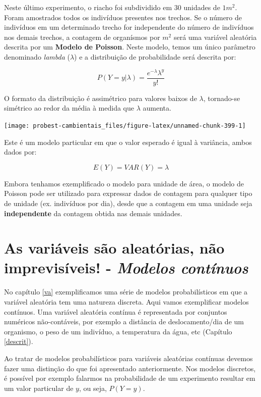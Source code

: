 \documentclass[
]{book}
\begin{document}
Neste último experimento, o riacho foi subdividido em 30 unidades de \(1m^2\). Foram amostrados todos os indivíduos presentes nos trechos. Se o número de indivíduos em um determinado trecho for independente do número de indivíduos nos demais trechos, a contagem de organísmos por \(m^2\) será uma variável aleatória descrita por um \textbf{Modelo de Poisson}. Neste modelo, temos um único parâmetro denominado \emph{lambda} (\(\lambda\)) e a distribuição de probabilidade será descrita por:

\[P(Y = y|\lambda) =  \frac{e^{-\lambda} \lambda^y}{y!}\]

O formato da distribuição é assimétrico para valores baixos de \(\lambda\), tornado-se simétrico ao redor da média à medida que \(\lambda\) aumenta.

\begin{center}\texttt{[image: probest-cambientais\_files/figure-latex/unnamed-chunk-399-1]} \end{center}

Este é um modelo particular em que o valor esperado é igual à variância, ambos dados por:

\[E(Y) = VAR(Y) = \lambda\]

Embora tenhamos exemplificado o modelo para unidade de área, o modelo de Poisson pode ser utilizado para expressar dados de contagem para qualquer tipo de unidade (ex. indivíduos por dia), desde que a contagem em uma unidade seja \textbf{independente} da contagem obtida nas demais unidades.

\hypertarget{vacont}{%
\chapter{\texorpdfstring{As variáveis são aleatórias, não imprevisíveis! - \emph{Modelos contínuos}}{As variáveis são aleatórias, não imprevisíveis! - Modelos contínuos}}\label{vacont}}

No capítulo \ref{va} exemplificamos uma série de modelos probabilísticos em que a variável aleatória tem uma natureza discreta. Aqui vamos exemplificar modelos contínuos. Uma variável aleatória contínua é representada por conjuntos numéricos não-contáveis, por exemplo a distância de deslocamento/dia de um organismo, o peso de um indivíduo, a temperatura da água, etc (Capítulo \ref{descrit}).

Ao tratar de modelos probabilísticos para variáveis aleatórias contínuas devemos fazer uma distinção do que foi apresentado anteriormente. Nos modelos discretos, é possível por exemplo falarmos na probabilidade de um experimento resultar em um valor particular de \(y\), ou seja, \(P(Y = y)\).
\end{document}
